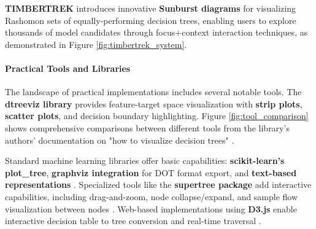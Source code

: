 \textbf{TIMBERTREK} \cite{wang2022timbertrek} introduces innovative \textbf{Sunburst diagrams} \cite{885091} for visualizing Rashomon sets of equally-performing decision trees, enabling users to explore thousands of model candidates through focus+context \cite{readingsInformationVi} interaction techniques, as demonstrated in Figure \ref{fig:timbertrek_system}.

\paragraph{Practical Tools and Libraries}

The landscape of practical implementations includes several notable tools. The \textbf{dtreeviz library} provides feature-target space visualization with \textbf{strip plots}, \textbf{scatter plots}, and decision boundary highlighting. Figure \ref{fig:tool_comparison} shows comprehensive comparisons between different tools from the library's authors' documentation on "how to visualize decision trees" \cite{parr2019dtreeviz}.

Standard machine learning libraries offer basic capabilities: \textbf{scikit-learn's plot\_tree}, \textbf{graphviz integration} for DOT format export, and \textbf{text-based representations} \cite{plonski2021visualize}. Specialized tools like the \textbf{supertree package} add interactive capabilities, including drag-and-zoom, node collapse/expand, and sample flow visualization between nodes \cite{plonski2021visualize}. Web-based implementations using \textbf{D3.js} enable interactive decision table to tree conversion and real-time traversal \cite{joesquito2024decision}.

